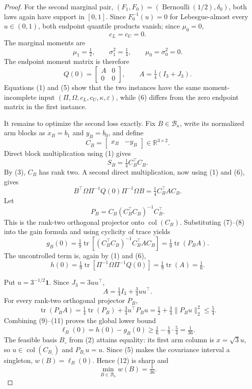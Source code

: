 \documentclass{article}
\begin{document}
\begin{proof}
For the second marginal pair, \((F_1,F_0)=(\operatorname{Bernoulli}(1/2),\delta_0)\), both laws again have support in \([0,1]\).  Since \(F_0^{-1}(u)=0\) for Lebesgue-almost every \(u\in(0,1)\), both endpoint quantile products vanish; since \(\mu_0=0\),
\[
c_L=c_U=0.
\tag{5}
\]
The marginal moments are
\[
\mu_1=\tfrac12,
\qquad
\sigma_1^2=\tfrac14,
\qquad
\mu_0=\sigma_0^2=0.
\]
The endpoint moment matrix is therefore
\[
Q(0)=\begin{bmatrix}A&0\\0&0\end{bmatrix},
\qquad
A=\tfrac14(I_3+J_3).
\tag{6}
\]
Equations (1) and (5) show that the two instances have the same moment-incomplete input \((\Pi,\Omega,c_L,c_U,\kappa,\varepsilon)\), while (6) differs from the zero endpoint matrix in the first instance.

It remains to optimize the second loss exactly.  Fix \(B\in\mathcal B_\kappa\), write its normalized arm blocks as \(x_B=b_1\) and \(y_B=b_0\), and define
\[
C_B=\begin{bmatrix}x_B&-y_B\end{bmatrix}\in\mathbb R^{3\times2}.
\]
Direct block multiplication using (1) gives
\[
S_B=\tfrac14C_B^{\top}C_B.
\tag{7}
\]
By (3), \(C_B\) has rank two.  A second direct multiplication, now using (1) and (6), gives
\[
B^{\top}\Omega\Pi^{-1}Q(0)\Pi^{-1}\Omega B
=\tfrac14C_B^{\top}AC_B.
\tag{8}
\]
Let
\[
P_B=C_B(C_B^{\top}C_B)^{-1}C_B^{\top}.
\]
This is the rank-two orthogonal projector onto \(\operatorname{col}(C_B)\).  Substituting (7)--(8) into the gain formula and using cyclicity of trace yields
\[
g_B(0)
=\tfrac19\operatorname{tr}\!\left[(C_B^{\top}C_B)^{-1}C_B^{\top}AC_B\right]
=\tfrac19\operatorname{tr}(P_BA).
\tag{9}
\]
The uncontrolled term is, again by (1) and (6),
\[
h(0)
=\tfrac19\operatorname{tr}\!\left[\Pi^{-1}\Omega\Pi^{-1}Q(0)\right]
=\tfrac19\operatorname{tr}(A)
=\tfrac16.
\tag{10}
\]

Put \(u=3^{-1/2}\mathbf1\).  Since \(J_3=3uu^{\top}\),
\[
A=\tfrac14I_3+\tfrac34uu^{\top}.
\]
For every rank-two orthogonal projector \(P_B\),
\[
\operatorname{tr}(P_BA)
=\tfrac14\operatorname{tr}(P_B)+\tfrac34u^{\top}P_Bu
=\tfrac12+\tfrac34\lVert P_Bu\rVert_2^2
\le\tfrac54.
\tag{11}
\]
Combining (9)--(11) proves the global lower bound
\[
\ell_B(0)=h(0)-g_B(0)
\ge\tfrac16-\tfrac19\cdot\tfrac54
=\tfrac1{36}.
\tag{12}
\]
The feasible basis \(B_\circ\) from (2) attains equality: its first arm column is \(x=\sqrt3u\), so \(u\in\operatorname{col}(C_{B_\circ})\) and \(P_{B_\circ}u=u\).  Since (5) makes the covariance interval a singleton, \(w(B)=\ell_B(0)\).  Hence (12) is sharp and
\[
\min_{B\in\mathcal B_\kappa}w(B)=\tfrac1{36}.
\tag{13}
\]


\end{proof}
\end{document}
